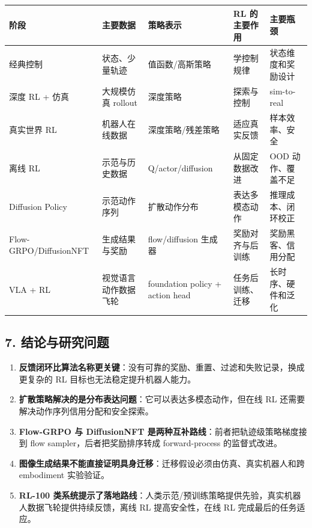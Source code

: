 \documentclass[
  chinese,
]{article}
\providecommand{\tightlist}{%
  \setlength{\itemsep}{0pt}\setlength{\parskip}{0pt}}
\begin{document}
\begin{longtable}[]{@{}lllll@{}}
\toprule\noalign{}
阶段 & 主要数据 & 策略表示 & RL 的主要作用 & 主要瓶颈 \\
\midrule\noalign{}
\endhead
\bottomrule\noalign{}
\endlastfoot
经典控制 & 状态、少量轨迹 & 值函数/高斯策略 & 学控制规律 &
状态维度和奖励设计 \\
深度 RL + 仿真 & 大规模仿真 rollout & 深度策略 & 探索与控制 &
sim-to-real \\
真实世界 RL & 机器人在线数据 & 深度策略/残差策略 & 适应真实反馈 &
样本效率、安全 \\
离线 RL & 示范与历史数据 & Q/actor/diffusion & 从固定数据改进 & OOD
动作、覆盖不足 \\
Diffusion Policy & 示范动作序列 & 扩散动作分布 & 表达多模态动作 &
推理成本、闭环校正 \\
Flow-GRPO/DiffusionNFT & 生成结果与奖励 & flow/diffusion 生成器 &
奖励对齐与后训练 & 奖励黑客、信用分配 \\
VLA + RL & 视觉语言动作数据飞轮 & foundation policy + action head &
任务后训练、迁移 & 长时序、硬件和泛化 \\
\end{longtable}

\subsection{7.
结论与研究问题}\label{7-ux7ed3ux8bbaux4e0eux7814ux7a76ux95eeux9898}

\begin{enumerate}
\def\labelenumi{\arabic{enumi}.}
\tightlist
\item
  \textbf{反馈闭环比算法名称更关键}：没有可靠的奖励、重置、过滤和失败记录，换成更复杂的
  RL 目标也无法稳定提升机器人能力。
\item
  \textbf{扩散策略解决的是分布表达问题}：它可以表达多模态动作，但在线 RL
  还需要解决动作序列信用分配和安全探索。
\item
  \textbf{Flow-GRPO 与 DiffusionNFT
  是两种互补路线}：前者把轨迹级策略梯度接到 flow
  sampler，后者把奖励排序转成 forward-process 的监督式改进。
\item
  \textbf{图像生成结果不能直接证明具身迁移}：迁移假设必须由仿真、真实机器人和跨
  embodiment 实验验证。
\item
  \textbf{RL-100
  类系统提示了落地路线}：人类示范/预训练策略提供先验，真实机器人数据飞轮提供持续反馈，离线
  RL 提高安全性，在线 RL 完成最后的任务适应。
\end{enumerate}
\end{document}
